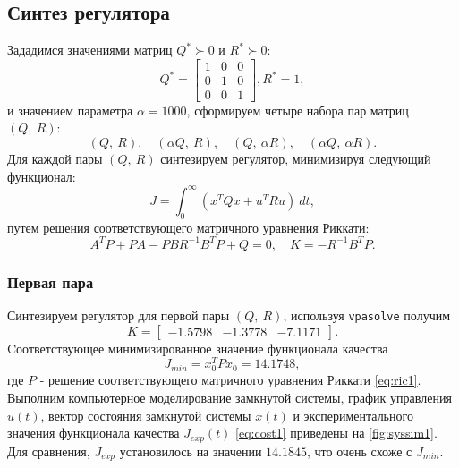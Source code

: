\subsection{Синтез регулятора}

Зададимся значениями матриц $Q^*\succ0$ и $R^*\succ0$:
\begin{equation*}
    Q^*=\begin{bmatrix}
        1 & 0 & 0\\
        0 & 1 & 0\\
        0 & 0 & 1
    \end{bmatrix},
    R^*=1,
\end{equation*}
и значением параметра $\alpha=1000$, сформируем четыре набора пар матриц $(Q,\ R)$:
$$(Q,\ R),\quad (\alpha Q,\ R),\quad (Q,\ \alpha R),\quad (\alpha Q,\ \alpha R).$$
Для каждой пары $(Q,\ R)$ синтезируем регулятор, минимизируя следующий функционал:
\begin{equation}
    \label{eq:cost1}
    J=\int_0^{\infty}(x^TQx+u^TRu)\ dt,
\end{equation}
путем решения  соответствующего матричного уравнения Риккати:
\begin{equation}
    \label{eq:ric1}
    A^TP+PA-PBR^{-1}B^TP+Q=0,\quad K=-R^{-1}B^TP.
\end{equation}

\subsubsection{Первая пара}

Синтезируем регулятор для первой пары $(Q,\ R)$, используя \texttt{vpasolve}
получим
\begin{equation*}
    K=\begin{bmatrix}
        -1.5798 &  -1.3778  & -7.1171
    \end{bmatrix}.
\end{equation*}
Cоответствующее минимизированное значение функционала качества
\begin{equation*}
    J_{min}=x_0^TPx_0=14.1748,
\end{equation*}
где $P$ - решение соответствующего матричного уравнения Риккати \eqref{eq:ric1}.
Выполним компьютерное моделирование замкнутой системы,
график управления $u(t)$, вектор состояния замкнутой системы $x(t)$ и 
экспериментального значения функционала качества $J_{exp}(t)$ \eqref{eq:cost1}
приведены на \autoref{fig:syssim1}. Для сравнения, $J_{exp}$ установилось на
значении $14.1845$, что очень схоже с $J_{min}$.

